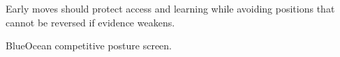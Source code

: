 \documentclass[10pt,a4paper]{article}
\begin{document}
\vspace{1pt}\noindent\begin{minipage}[t]{0.92\linewidth}
{\footnotesize\color{BOText} Early moves should protect access and learning while avoiding positions that cannot be reversed if evidence weakens.}\par
\end{minipage}\par\vspace{1pt}
\par
{\scriptsize\color{BOMuted} BlueOcean competitive posture screen.}\par
\end{document}
